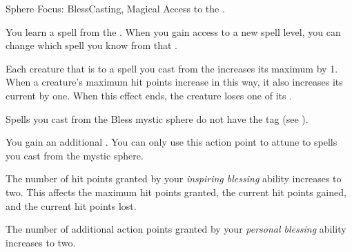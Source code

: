     \begin{feat}{Sphere Focus: Bless}{Casting, Magical}
        \featpre Access to the  .

         You learn a spell from the  .
        When you gain access to a new spell level, you can change which spell you know from that .

         Each creature that is  to a spell you cast from the   increases its maximum  by 1.
        When a creature's maximum hit points increase in this way, it also increases its current  by one.
        When this effect ends, the creature loses one of its .

         Spells you cast from the Bless mystic sphere do not have the  tag (see ).

         You gain an additional .
        You can only use this action point to attune to spells you cast from the  mystic sphere.

         The number of hit points granted by your \textit{inspiring blessing} ability increases to two.
        This affects the maximum hit points granted, the current hit points gained, and the current hit points lost.

         The number of additional action points granted by your \textit{personal blessing} ability increases to two.
    \end{feat}

